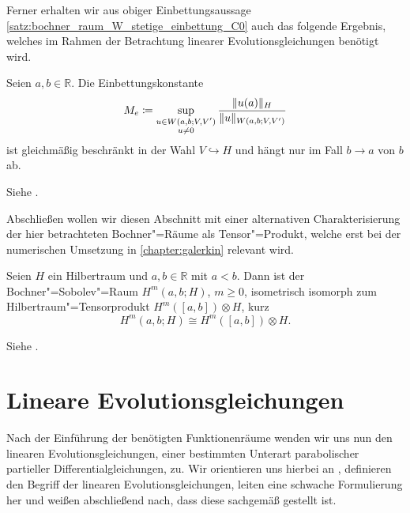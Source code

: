 Ferner erhalten wir aus obiger Einbettungsaussage \cref{satz:bochner_raum_W_stetige_einbettung_C0} auch das folgende Ergebnis, welches im Rahmen der Betrachtung linearer Evolutionsgleichungen benötigt wird.

\begin{Korollar}
\label{korollar:einbettungskonstante_M_e}
    Seien $a, b \in \mathbb{R}$.
    Die Einbettungskonstante
    \begin{equation}
        \label{eq:einbettungskonstante_M_e}
        M_{e} \coloneqq \sup_{\substack{u\in W(a, b; V, V')\\u \neq 0}} \frac{\lVert u(a)\rVert_{H}}{\lVert u\rVert_{W(a, b; V, V')}}
    \end{equation}
    ist gleichmäßig beschränkt in der Wahl $V \hookrightarrow H$ und hängt nur im Fall $b \to a$ von $b$ ab.

    \begin{Beweis}
        Siehe \cites[Section 5]{Schwab:2009ec}[Beweis zu Theorem XVIII.2.1]{Dautray:1992by}.
    \end{Beweis}
\end{Korollar}

Abschließen wollen wir diesen Abschnitt mit einer alternativen Charakterisierung der hier betrachteten Bochner"=Räume als Tensor"=Produkt, welche erst bei der numerischen Umsetzung in \cref{chapter:galerkin} relevant wird.

\begin{Satz}
\label{satz:bochner_sobolev_raum_als_tensorprodukt}
    Seien $H$ ein Hilbertraum und $a, b \in \mathbb{R}$ mit $a < b$.
    Dann ist der Bochner"=Sobolev"=Raum $H^{m}(a, b; H)$, $m \geq 0$, isometrisch isomorph zum Hilbertraum"=Tensorprodukt $H^{m}([a, b]) \otimes H$, kurz
    \begin{equation}
        H^{m}(a, b; H) \cong H^{m}([a, b]) \otimes H.
    \end{equation}

    \begin{Beweis}
        Siehe \cite[Theorem 12.6.1, Theorem 12.7.1]{Aubin:2000un}.
    \end{Beweis}
\end{Satz}


\section{Lineare Evolutionsgleichungen} %
\label{sec:gl:le:lineare_evolutionsgleichungen}

Nach der Einführung der benötigten Funktionenräume wenden wir uns nun den linearen Evolutionsgleichungen, einer bestimmten Unterart parabolischer partieller Differentialgleichungen, zu.
Wir orientieren uns hierbei an \textcite{Lions:1971wp,Schwab:2009ec,Urban:2014kg},
definieren den Begriff der linearen Evolutionsgleichungen, leiten eine schwache Formulierung her und weißen abschließend nach, dass diese sachgemäß gestellt ist.

